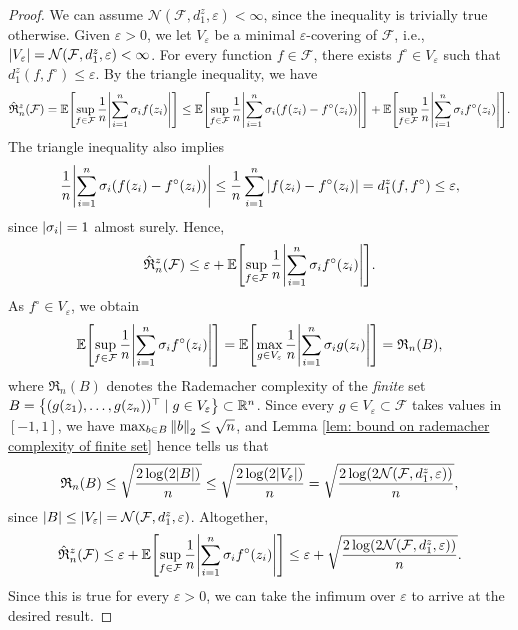 \begin{proof}
We can assume $\mathcal{N}(\mathcal{F}, d_1^z, \varepsilon) < \infty$, since the inequality is trivially true otherwise. Given $\varepsilon > 0$, we let $V_{\varepsilon}$ be a minimal $\varepsilon$-covering of $\mathcal{F}$, i.e., $\abs{V_{\varepsilon}} = \mathcal{N}(\mathcal{F}, d_1^z, \varepsilon) < \infty$. For every function $f \in \mathcal{F}$, there exists $f^{\circ} \in V_{\varepsilon}$ such that $d_1^z(f, f^{\circ}) \leq \varepsilon$. By the triangle inequality, we have
\[
    \hat{\mathfrak{R}}_n^z(\mathcal{F}) = \Exp\left[\sup_{f \in \mathcal{F}} \frac{1}{n} \abs{\sum_{i=1}^n \sigma_i f(z_i)}\right] \leq \Exp\left[\sup_{f \in \mathcal{F}} \frac{1}{n} \abs{\sum_{i=1}^n \sigma_i (f(z_i) - f^{\circ}(z_i))}\right] + \Exp\left[\sup_{f \in \mathcal{F}} \frac{1}{n} \abs{\sum_{i=1}^n \sigma_i f^{\circ}(z_i)}\right].
\]
The triangle inequality also implies
\[
    \frac{1}{n} \abs{\sum_{i=1}^n \sigma_i (f(z_i) - f^{\circ}(z_i))} \leq \frac{1}{n} \sum_{i=1}^n \abs{f(z_i) - f^{\circ}(z_i)} = d_1^z(f, f^{\circ}) \leq \varepsilon,
\]
since $\abs{\sigma_i} = 1$ almost surely. Hence,
\[
    \hat{\mathfrak{R}}_n^z(\mathcal{F}) \leq \varepsilon + \Exp\left[\sup_{f \in \mathcal{F}} \frac{1}{n} \abs{\sum_{i=1}^n \sigma_i f^{\circ}(z_i)}\right].
\]
As $f^{\circ} \in V_{\varepsilon}$, we obtain
\[
    \Exp\left[\sup_{f \in \mathcal{F}} \frac{1}{n} \abs{\sum_{i=1}^n \sigma_i f^{\circ}(z_i)}\right] = \Exp\left[\max_{g \in V_{\varepsilon}} \frac{1}{n} \abs{\sum_{i=1}^n \sigma_i g(z_i)}\right] = \mathfrak{R}_n(B),
\]
where $\mathfrak{R}_n(B)$ denotes the Rademacher complexity of the \emph{finite} set $B = \set{(g(z_1), \dots, g(z_n))^{\top} \with g \in V_{\varepsilon}} \subset \R^n$. Since every $g \in V_{\varepsilon} \subset \mathcal{F}$ takes values in $[-1, 1]$, we have $\max_{b \in B} \norm{b}_2 \leq \sqrt{n}$, and Lemma \ref{lem: bound on rademacher complexity of finite set} hence tells us that
\[
    \mathfrak{R}_n(B) \leq \sqrt{\frac{2 \log(2 \abs{B})}{n}} \leq \sqrt{\frac{2 \operatorname{log}(2 \abs{V_{\varepsilon}})}{n}} = \sqrt{\frac{2 \operatorname{log}(2 \mathcal{N}(\mathcal{F}, d_1^z, \varepsilon))}{n}},
\]
since $\abs{B} \leq \abs{V_{\varepsilon}} = \mathcal{N}(\mathcal{F}, d_1^z, \varepsilon)$. Altogether,
\[
    \hat{\mathfrak{R}}_n^z(\mathcal{F}) \leq \varepsilon + \Exp\left[\sup_{f \in \mathcal{F}} \frac{1}{n} \abs{\sum_{i=1}^n \sigma_i f^{\circ}(z_i)}\right] \leq \varepsilon + \sqrt{\frac{2 \operatorname{log}(2 \mathcal{N}(\mathcal{F}, d_1^z, \varepsilon))}{n}}.
\]
Since this is true for every $\varepsilon > 0$, we can take the infimum over $\varepsilon$ to arrive at the desired result.
\end{proof}

